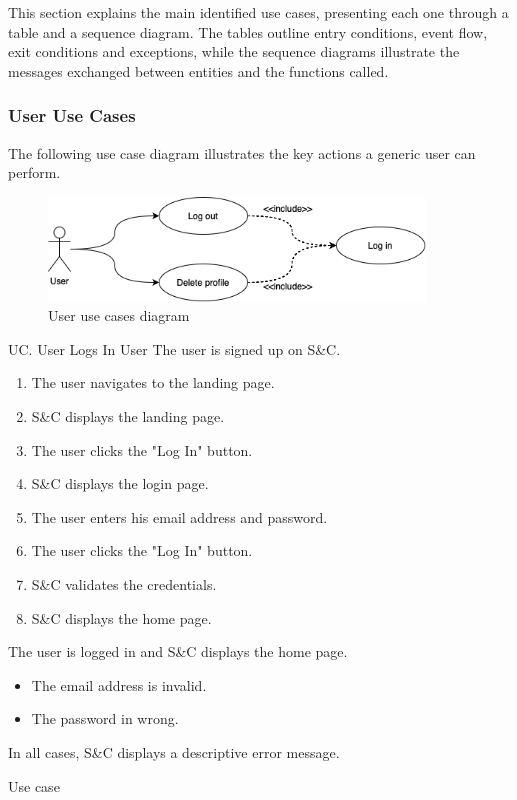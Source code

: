 This section explains the main identified use cases, presenting each one through a table and a sequence diagram.
The tables outline entry conditions, event flow, exit conditions and exceptions, while the sequence diagrams illustrate the messages exchanged between entities and the functions called.

\setcounter{uc}{1}

\clearpage
\subsubsection{User Use Cases}
The following use case diagram illustrates the key actions a generic user can perform.

\begin{figure}[h]
    \centering
    \includegraphics[width=10cm]{images/use-case-diagrams/user.png}
    \caption{User use cases diagram}
\end{figure}

\clearpage
\begin{usecase}
    {UC\theuc. User Logs In}
    {User}
    {The user is signed up on S\&C.}
    {\begin{enumerate}[leftmargin=*]
        \item The user navigates to the landing page.
        \item S\&C displays the landing page.
        \item The user clicks the "Log In" button.
        \item S\&C displays the login page.
        \item The user enters his email address and password.
        \item The user clicks the "Log In" button.
        \item S\&C validates the credentials.
        \item S\&C displays the home page.
    \end{enumerate}}
    {The user is logged in and S\&C displays the home page.}
    {\begin{itemize}[leftmargin=*, label=\tiny\textbullet]
        \item The email address is invalid.
        \item The password in wrong.
        \end{itemize}
        In all cases, S\&C displays a descriptive error message.}
    {Use case \theuc}
\end{usecase}

